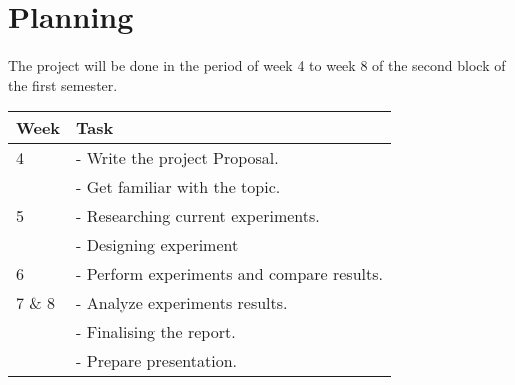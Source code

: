 \section{Planning}
\paragraph{}
The project will be done in the period of week 4
to week 8 of the second block of the first semester.


\center
\begin{tabular}{ | l| l | } 
\hline 
\textbf{Week} & \textbf{Task} \\
\hline
4	& - Write the project Proposal. \\
	& - Get familiar with the topic. \\
\hline
5 	& - Researching current experiments. \\
    & - Designing experiment  \\
\hline
6  & - Perform experiments and compare results. \\
\hline
7 \& 8 & - Analyze experiments results. \\
       & - Finalising the report. \\
       & - Prepare presentation. \\
\hline
\end{tabular}
\label{tab:planning}
\flushleft